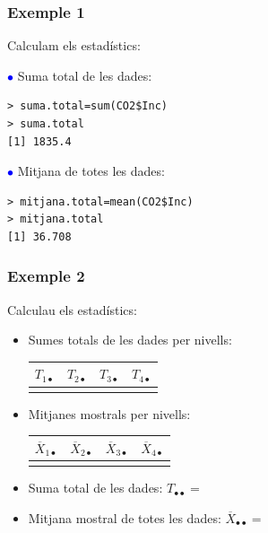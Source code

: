 \documentclass[12pt,t]{beamer}
\newcommand{\blue}[1]{\textcolor{blue}{#1}}
\theoremstyle{plain}
\theoremstyle{definition}
\begin{document}
\begin{frame}[fragile]
\frametitle{Exemple 1}
Calculam els estadístics:\medskip

\blue{$\mathbf \bullet$} Suma total de les dades:

\begin{verbatim}
> suma.total=sum(CO2$Inc)
> suma.total
[1] 1835.4
\end{verbatim}\medskip

\blue{$\mathbf \bullet$} Mitjana de totes les dades:

\begin{verbatim}
> mitjana.total=mean(CO2$Inc)
> mitjana.total
[1] 36.708
\end{verbatim}

\end{frame}
\begin{frame}
\frametitle{Exemple 2}
Calculau els estadístics:
\begin{itemize}
\item Sumes totals de les dades per nivells:
\begin{center}
\begin{tabular}{c|c|c|c}
\quad${T_{1\bullet}}$\quad{} & \quad${T_{2\bullet}}$\quad{} & \quad${T_{3\bullet}}$\quad{} & \quad${T_{4\bullet}}$\quad{} \\
\hline
 &
 &
 & 
\end{tabular}
\end{center}
\medskip

\item Mitjanes mostrals per nivells:
\begin{center}
\begin{tabular}{c|c|c|c}
\quad${\overline{X}_{1\bullet}}$\quad{} & \quad${\overline{X}_{2\bullet}}$\quad{} & \quad${\overline{X}_{3\bullet}}$\quad{} & \quad${\overline{X}_{4\bullet}}$\quad{} \\
\hline
&
&
&
\end{tabular}
\end{center}
\medskip

\item Suma total de les dades: $T_{\bullet\bullet}=$
\medskip



\item Mitjana mostral de totes les dades: $\overline{X}_{\bullet\bullet}=$

\end{itemize}

\end{frame}
\end{document}
